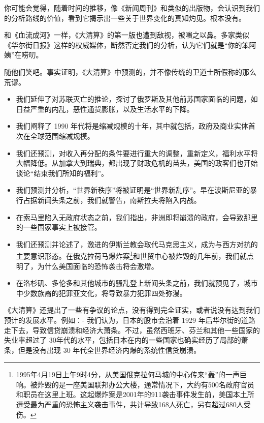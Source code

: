 你可能会觉得，随着时间的推移，像《新闻周刊》和类似的出版物，会认识到我们的分析路线的价值，看到它揭示出一些关于世界变化的真知灼见。根本没有。


和《血流成河》一样，《大清算》的第一版也遭到敌视，被嗤之以鼻。多家类似《华尔街日报》这样的权威媒体，断然否定我们的分析，认为它们就是“你的笨阿姨”在唠叨。


随他们笑吧。事实证明，《大清算》中预测的，并不像传统的卫道士所假称的那么荒谬。

\begin{itemize}
    \item 我们延伸了对苏联灭亡的推论，探讨了俄罗斯及其他前苏国家面临的问题，如日益严重的内乱，恶性通货膨胀，以及生活水平的下降。
    \item 我们阐释了 1990 年代将是缩减规模的十年，其中就包括，政府及商业实体首次在全球范围缩减规模。
    \item 我们还预测，对收入再分配的条件要进行重大的调整，重新定义，福利水平将大幅降低。从加拿大到瑞典，都出现了财政危机的苗头，美国的政客们也开始谈论“结束我们所知的福利”。
    \item 我们预测并分析，“世界新秩序”将被证明是“世界新乱序”。早在波斯尼亚的暴行占据新闻头条之前，我们就警告，南斯拉夫将陷入内战。
    \item 在索马里陷入无政府状态之前，我们指出，非洲即将崩溃的政府，会导致那里的一些国家事实上被接管。
    \item 我们还预测并论述了，激进的伊斯兰教会取代马克思主义，成为与西方对抗的主要意识形态。在俄克拉荷马爆炸案\footnote{1995年4月19日上午9时4分，从美国俄克拉何马城的中心传来“轰”的一声巨响。被炸毁的是一座美国联邦办公大楼，通常情况下，大约有500名政府官员和职员在这里上班。这起爆炸案是2001年的911袭击事件发生前，美国本土所遭受最为严重的恐怖主义袭击事件，共计导致168人死亡，另有超过680人受伤。}和世贸中心被炸毁的几年前，我们就点明了，为什么美国面临的恐怖袭击将会激增。
    \item 在洛杉矶、多伦多和其他城市的骚乱登上新闻头条之前，我们就预见了，城市中少数族裔的犯罪亚文化，将导致暴力犯罪四处弥漫。
\end{itemize}

《大清算》还提出了一些有争议的论点，没有得到完全证实，或者说没有达到我们预计的发展水平。例如：- 我们认为，日本的股市会沿着 1929 年后华尔街的道路走下去，导致信贷崩溃和经济大萧条。不过，虽然西班牙、芬兰和其他一些国家的失业率超过了 30年代的水平，包括日本在内的一些国家也确实经历了局部的萧条，但是没有出现 30 年代全世界经济内爆的系统性信贷崩溃。

